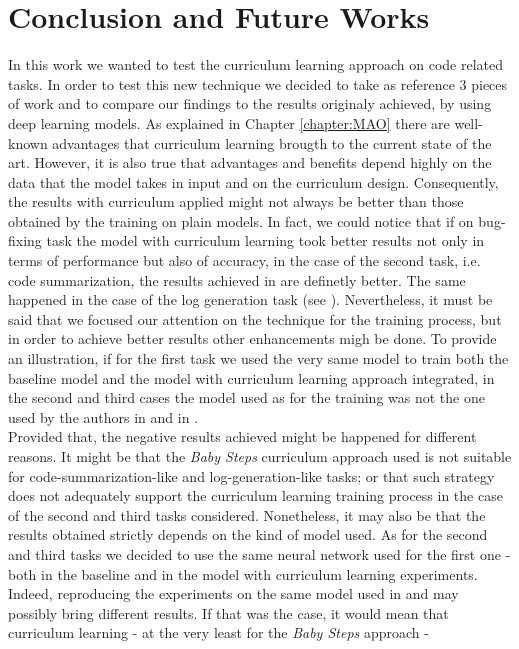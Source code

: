 \chapter{Conclusion and Future Works}
In this work we wanted to test the curriculum learning approach on code related tasks.
In order to test this new technique we decided to take as reference 3 pieces of work and to compare 
our findings to the results originaly achieved, by using deep learning models.
As explained in Chapter \ref{chapter:MAO} there are well-known advantages that curriculum learning
brougth to the current state of the art. However, it is also true that advantages and benefits depend highly on the data 
that the model takes in input and on the curriculum design. Consequently, the results with curriculum applied might not always be better than 
those obtained by the training on plain models. 
In fact, we could notice that if on bug-fixing task the model with curriculum learning 
took better results not only in terms of performance but also of accuracy, 
in the case of the second task, i.e. code summarization, the results achieved in \cite{Leclair2020}
are definetly better. The same happened in the case of the log generation task (see \cite{Mastropaolo2022}).
Nevertheless, it must be said that we focused our attention on the technique for the training process, but in order to achieve better 
results other enhancements migh be done. To provide an illustration, if for the first task we used the very same model 
to train both the baseline model and the model with curriculum learning approach integrated, in the second and third cases the model used as for the training was not the 
one used by the authors in \cite{Leclair2020} and in \cite{Mastropaolo2022}. \\
Provided that, the negative results achieved might be happened for different reasons.
It might be that 
the \textit{Baby Steps} curriculum approach used is not suitable for code-summarization-like and log-generation-like tasks;
or that such strategy does not adequately support the curriculum learning training process in the case of the second and third tasks considered.
Nonetheless, it may also be that the results obtained 
strictly depends on the kind of model used. As for the second and third tasks we decided to use the same neural network used 
for the first one - both in the baseline and in the model with curriculum learning experiments.
Indeed, 
reproducing the experiments on the same model used in \cite{Leclair2020} and \cite{Mastropaolo2022} may possibly bring different results.
If that was the case, it would mean that curriculum learning - at the very least for the \textit{Baby Steps} approach - 
